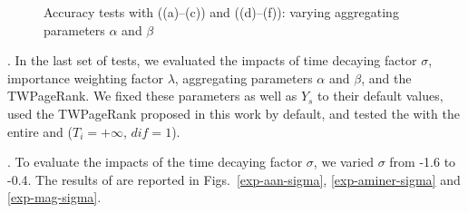 \begin{figure}[tb!]
\begin{center}
\hfill
{}
\end{center}
\vspace{-2ex}
\caption{\small Accuracy tests with \recom ((a)--(c)) and \fcita ((d)--(f)): varying aggregating parameters $\alpha$ and $\beta$}
\label{exp-ab}
\vspace{-2ex}
\end{figure}

.
In the last set of tests, we evaluated the impacts of time decaying factor $\sigma$, importance weighting factor $\lambda$, aggregating parameters $\alpha$ and $\beta$, and the TWPageRank. We fixed these parameters as well as $Y_s$ to their default values, used the TWPageRank proposed in this work by default, and tested the \PairAcc with the entire \recom and \fcita (\ie $T_i=+\infty$, $dif=1$).





.
To evaluate the impacts of the time decaying factor $\sigma$, we varied $\sigma$ from -1.6 to -0.4.
The results of \PairAcc are reported in Figs.~\ref{exp-aan-sigma}, \ref{exp-aminer-sigma} and \ref{exp-mag-sigma}.


